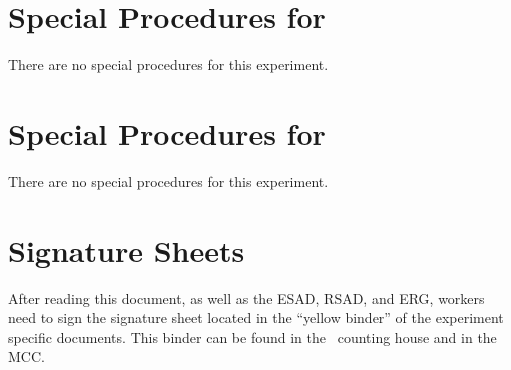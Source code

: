 
%
%
\newpage
\section{Special Procedures for \HALL}

There are no special procedures for this experiment.



%
%
\newpage
\section{Special Procedures for \EXPTS}

There are no special procedures for this experiment.




\newpage
\section{Signature Sheets}

After reading this document, as well as the ESAD, RSAD, and ERG, workers need to sign
the signature sheet located in the ``yellow binder'' of the experiment specific documents.
This binder can be found in the \HALL\ counting house and in the MCC.

